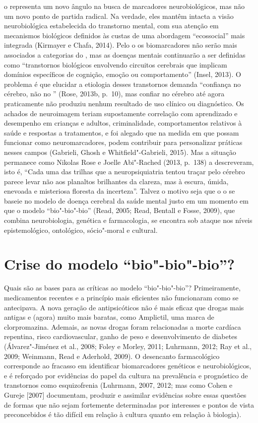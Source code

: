 o representa um novo ângulo na busca de marcadores neurobiológicos,
mas não um novo ponto de partida radical. Na verdade, eles mantêm
intacta a visão neurobiológica estabelecida do transtorno mental, com
sua atenção em mecanismos biológicos definidos às custas de uma
abordagem ``ecossocial'' mais integrada (Kirmayer e Chafa, 2014). Pelo
o os biomarcadores não serão mais associados a categorias do
\emph{}, mas as doenças mentais continuarão a ser definidas como
``transtornos biológicos envolvendo circuitos cerebrais que implicam
domínios específicos de cognição, emoção ou comportamento'' (Insel,
2013). O problema é que elucidar a etiologia desses transtornos demanda
``confiança no cérebro, não no '' (Rose, 2013b, p.~10), mas confiar no
cérebro até agora praticamente não produziu nenhum resultado de uso
clínico ou diagnóstico. Os achados de neuroimagem teriam supostamente
correlação com aprendizado e desempenho em crianças e adultos,
criminalidade, comportamentos relativos à saúde e respostas a
tratamentos, e foi alegado que na medida em que possam funcionar como
neuromarcadores, podem contribuir para personalizar práticas nesses
campos (Gabrieli, Ghosh e Whitfield"-Gabrieli, 2015). Mas a situação
permanece como Nikolas Rose e Joelle Abi"-Rached (2013, p.~138) a
descreveram, isto é, ``Cada uma das trilhas que a neuropsiquiatria
tentou traçar pelo cérebro parece levar não aos planaltos brilhantes da
clareza, mas à escura, úmida, enevoada e misteriosa floresta da
incerteza''. Talvez o motivo seja que o o se baseie no modelo de
doença cerebral da saúde mental justo em um momento em que o modelo
``bio"-bio"-bio'' (Read, 2005; Read, Bentall e Fosse, 2009), que combina
neurobiologia, genética e farmacologia, se encontra sob ataque nos
níveis epistemológico, ontológico, sócio"-moral e cultural.

\section{Crise do modelo ``bio"-bio"-bio''?}

Quais são as bases para as críticas ao modelo ``bio"-bio"-bio''?
Primeiramente, medicamentos recentes e a princípio mais eficientes não
funcionaram como se antecipava. A nova geração de antipsicóticos não é
mais eficaz que drogas mais antigas e (agora) muito mais baratas, como
Amplictil, uma marca de clorpromazina. Ademais, as novas drogas foram
relacionadas a morte cardíaca repentina, risco cardiovascular, ganho de
peso e desenvolvimento de diabetes (Álvarez"-Jiménez et al., 2008; Foley
e Morley, 2011; Luhrmann, 2012; Ray et al., 2009; Weinmann, Read e
Aderhold, 2009). O desencanto farmacológico corresponde ao fracasso em
identificar biomarcadores genéticos e neurobiológicos, e é reforçado por
evidências do papel da cultura na prevalência e prognóstico de
transtornos como esquizofrenia (Luhrmann, 2007, 2012; mas como Cohen e
Gureje {[}2007{]} documentam, produzir e assimilar evidências sobre
essas questões de formas que não sejam fortemente determinadas por
interesses e pontos de vista preconcebidos é tão difícil em relação à
cultura quanto em relação à biologia).

